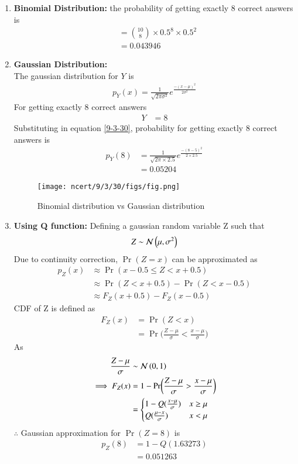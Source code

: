 \documentclass[journal,12pt,onecolumn]{IEEEtran}
\theoremstyle{remark}
\begin{document}
\begin{enumerate}
\item \textbf{Binomial Distribution:} 
the probability of getting exactly 8 correct answers is 
\begin{align}
	&= \binom{10}{8} \times 0.5^8\times 0.5^{2}\\
	&= 0.043946
\end{align}
\item \textbf{Gaussian Distribution:}\\
The gaussian distribution for $Y$ is
\begin{align}
	p_Y(x) = \frac{1}{\sqrt{2\pi\sigma^2}}e^{\frac{-(x-\mu)^2}{2\sigma^2}}\label{9-3-30}
\end{align}
For getting exactly 8 correct answers
\begin{align}
	Y &= 8
\end{align}
Substituting in equation \eqref{9-3-30}, probability for getting exactly 8 correct answers is
\begin{align}
	p_Y(8) &= \frac{1}{\sqrt{2\pi\times2.5}}e^{\frac{-(8-5)^2}{2\times2.5}}\\
	&= 0.05204
\end{align}
\begin{figure}[H]
\texttt{[image: ncert/9/3/30/figs/fig.png]}
\caption{Binomial distribution vs Gaussian distribution}
	\label{fig58:9-3-30}
\end{figure}
\item \textbf{Using Q function:}
Defining a gaussian random variable Z such that
\begin{align}
	Z \sim \mathcal{N}\left(\mu,\sigma^2\right)
\end{align}
Due to continuity correction, $\Pr(Z=x)$ can be approximated as
\begin{align}
	p_Z(x) &\approx \Pr(x-0.5\le Z < x+0.5)\\
	&\approx \Pr(Z < x+0.5) - \Pr(Z < x-0.5)\\
	&\approx F_Z(x+0.5)-F_Z(x-0.5)
\end{align}
CDF of Z is defined as
\begin{align}
	F_Z(x) &= \Pr(Z<x)\\
	&= \Pr\biggl(\frac{Z-\mu}{\sigma}<\frac{x-\mu}{\sigma}\biggr)
\end{align}
As
\begin{align}
	\frac{Z-\mu}{\sigma} &\sim \mathcal{N}\left(0,1\right)\\
	\implies F_Z(x) 
	&= 1 - \Pr\biggl(\frac{Z-\mu}{\sigma}>\frac{x-\mu}{\sigma}\biggr)\\
	&= \begin{cases}
		1-Q(\frac{x-\mu}{\sigma}) & x\geq \mu\\
		Q(\frac{\mu-x}{\sigma}) & x < \mu
	\end{cases}
\end{align}
$\therefore$ Gaussian approximation for $\Pr(Z = 8)$ is 
\begin{align}
	p_Z(8) &= 1-Q(1.63273) \\
	&= 0.051263
\end{align}
\end{enumerate}
\end{document}
